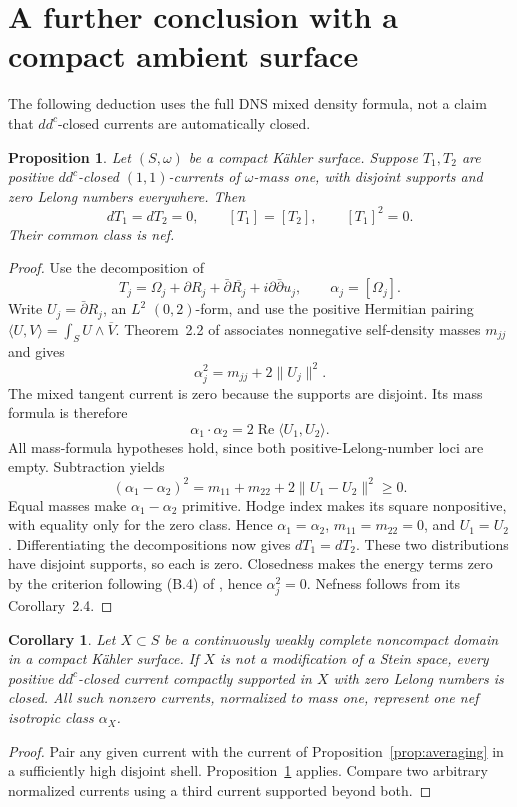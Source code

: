 \documentclass[11pt]{article}
\newtheorem{proposition}[theorem]{Proposition}
\newtheorem{corollary}[theorem]{Corollary}
\theoremstyle{remark}
\newcommand{\ddc}{dd^c}
\begin{document}


\section{A further conclusion with a compact ambient surface}
The following deduction uses the full DNS mixed density formula, not a claim that $\ddc$-closed currents are automatically closed.

\begin{proposition}\label{prop:disjoint}
Let $(S,\omega)$ be a compact K\"ahler surface. Suppose $T_1,T_2$ are positive $\ddc$-closed $(1,1)$-currents of $\omega$-mass one, with disjoint supports and zero Lelong numbers everywhere. Then
\[
 dT_1=dT_2=0,\qquad [T_1]=[T_2],\qquad [T_1]^2=0.
\]
Their common class is nef.
\end{proposition}
\begin{proof}
Use the decomposition of \cite[\S2.1 and Lemma~B.2]{DNS}
\[
 T_j=\Omega_j+\partial R_j+\bar\partial\overline{R_j}
       +i\partial\bar\partial u_j,
 \qquad \alpha_j=[\Omega_j].
\]
Write $U_j=\bar\partial R_j$, an $L^2$ $(0,2)$-form, and use the positive Hermitian pairing
$\langle U,V\rangle=\int_SU\wedge\overline V$.
Theorem~2.2 of \cite{DNS} associates nonnegative self-density masses $m_{jj}$ and gives
\[
 \alpha_j^2=m_{jj}+2\|U_j\|^2.
\]
The mixed tangent current is zero because the supports are disjoint. Its mass formula is therefore
\[
 \alpha_1\cdot\alpha_2=2\operatorname{Re}\langle U_1,U_2\rangle.
\]
All mass-formula hypotheses hold, since both positive-Lelong-number loci are empty. Subtraction yields
\[
 (\alpha_1-\alpha_2)^2
   =m_{11}+m_{22}+2\|U_1-U_2\|^2\ge0.
\]
Equal masses make $\alpha_1-\alpha_2$ primitive. Hodge index makes its square nonpositive, with equality only for the zero class. Hence
$\alpha_1=\alpha_2$, $m_{11}=m_{22}=0$, and $U_1=U_2$.
Differentiating the decompositions now gives $dT_1=dT_2$.
These two distributions have disjoint supports, so each is zero.
Closedness makes the energy terms zero by the criterion following (B.4) of \cite{DNS}, hence $\alpha_j^2=0$. Nefness follows from its Corollary~2.4.
\end{proof}

\begin{corollary}\label{cor:domain}
Let $X\subset S$ be a continuously weakly complete noncompact domain in a compact K\"ahler surface. If $X$ is not a modification of a Stein space, every positive $\ddc$-closed current compactly supported in $X$ with zero Lelong numbers is closed. All such nonzero currents, normalized to mass one, represent one nef isotropic class $\alpha_X$.
\end{corollary}
\begin{proof}
Pair any given current with the current of Proposition~\ref{prop:averaging} in a sufficiently high disjoint shell. Proposition~\ref{prop:disjoint} applies. Compare two arbitrary normalized currents using a third current supported beyond both.
\end{proof}
\end{document}
